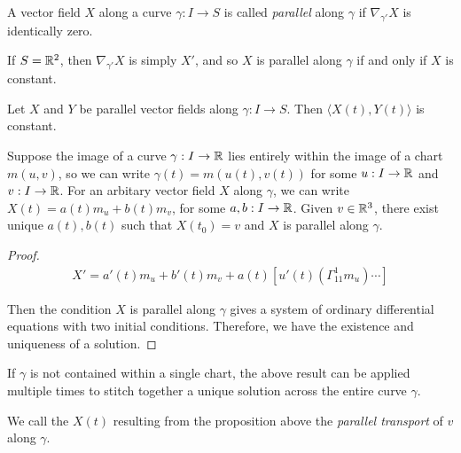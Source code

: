 \begin{defn}
    A vector field $X$ along a curve $\gamma: I \to S$ is called \emph{parallel} along $\gamma$ if $\nabla_{\gamma'}X$ is identically zero.
\end{defn}

\begin{exmp}
    If $S = \mathbb{R}^2$, then $\nabla_{\gamma'}X$ is simply $X'$, and so $X$ is parallel along $\gamma$ if and only if $X$ is constant.
\end{exmp}

\begin{prop}
    Let $X$ and $Y$ be parallel vector fields along $\gamma: I \to S$. Then $\langle X(t), Y(t)\rangle$ is constant.
\end{prop}

\begin{prop}\label{prop:parallel-vector-field-existance-uniqueness}
    Suppose the image of a curve $\gamma: I \to \mathbb{R}$ lies entirely within the image of a chart $m(u, v)$, so we can write $\gamma(t) = m(u(t), v(t))$ for some $u: I \to \mathbb{R}$ and $v: I \to \mathbb{R}$. For an arbitary vector field $X$ along $\gamma$, we can write $X(t) = a(t)m_u + b(t)m_v$, for some $a, b: I \to \mathbb{R}$. Given $v \in \mathbb{R}^3$, there exist unique $a(t), b(t)$ such that $X(t_0) = v$ and $X$ is parallel along $\gamma$.
\end{prop}

\begin{proof}
    \begin{align*}
        X' = a'(t)m_u + b'(t)m_v + a(t)\left[u'(t)\left(\Gamma_{11}^{1}m_u\right) \cdots\right]
    \end{align*}

    Then the condition $X$ is parallel along $\gamma$ gives a system of ordinary differential equations with two initial conditions. Therefore, we have the existence and uniqueness of a solution.
\end{proof}

\begin{rmk}
    If $\gamma$ is not contained within a single chart, the above result can be applied multiple times to stitch together a unique solution across the entire curve $\gamma$.
\end{rmk}

\begin{defn}
    We call the $X(t)$ resulting from the proposition above the \emph{parallel transport} of $v$ along $\gamma$.
\end{defn}

